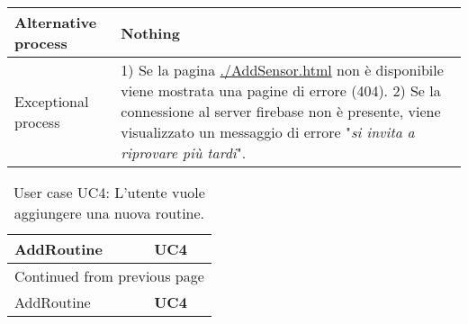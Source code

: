 \documentclass[onecolumn,a4paper]{article}
\begin{document}
\begin{longtable}{|l|p{9.7cm}|}
\hline
Alternative process & Nothing\\
\hline
Exceptional process & 1) Se la pagina \uline{./AddSensor.html} non è disponibile viene mostrata una pagine di errore (404). 2) Se la connessione al server firebase non è presente, viene visualizzato un messaggio di errore "\emph{si invita a riprovare più tardi}".\\
\hline
\end{longtable}

\begin{longtable}{|l|p{9.7cm}|}
\caption{User case UC4:  L'utente vuole aggiungere una nuova routine.}
\\
\cellcolor{grey!15}AddRoutine & \cellcolor{grey!15} \textbf{UC4}\\
\hline
\endfirsthead
\multicolumn{2}{l}{Continued from previous page} \\
\hline

\cellcolor{grey!15}AddRoutine & \cellcolor{grey!15} \textbf{UC4} \\


\end{longtable}
\end{document}
